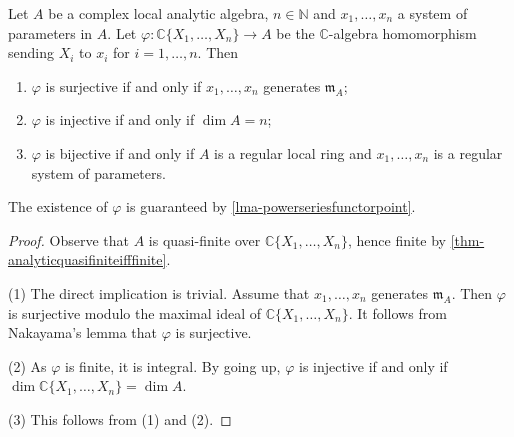 \begin{corollary}\label{cor-morphismpowertolocalsurinj}
    Let $A$ be a complex local analytic algebra, $n\in \mathbb{N}$ and $x_1,\ldots,x_n$ a system of parameters in $A$. Let $\varphi:\mathbb{C}\{X_1,\ldots,X_n\}\rightarrow A$ be the $\mathbb{C}$-algebra homomorphism sending $X_i$ to $x_i$ for $i=1,\ldots,n$. Then 
    \begin{enumerate}
        \item $\varphi$ is surjective if and only if $x_1,\ldots,x_n$ generates $\mathfrak{m}_A$;
        \item $\varphi$ is injective if and only if $\dim A=n$;
        \item $\varphi$ is bijective if and only if $A$ is a regular local ring and $x_1,\ldots,x_n$ is a regular system of parameters.
    \end{enumerate}
\end{corollary}
The existence of $\varphi$ is guaranteed by \cref{lma-powerseriesfunctorpoint}.

\begin{proof}
    Observe that $A$ is quasi-finite over $\mathbb{C}\{X_1,\ldots,X_n\}$, hence finite by  \cref{thm-analyticquasifiniteifffinite}. 

    (1) The direct implication is trivial. Assume that $x_1,\ldots,x_n$ generates $\mathfrak{m}_A$. Then $\varphi$ is surjective modulo the maximal ideal of $\mathbb{C}\{X_1,\ldots,X_n\}$. It follows from Nakayama's lemma that $\varphi$ is surjective.

    (2) As $\varphi$ is finite, it is integral. By going up, $\varphi$ is injective if and only if $\dim \mathbb{C}\{X_1,\ldots,X_n\}=\dim A$.

    (3) This follows from (1) and (2).
\end{proof}

